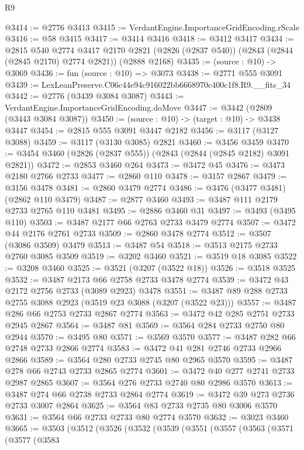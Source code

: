 \begin{lexlean}{R9}
\begin{coremodule}
@3414 := @2776 @3413
@3415 := VerdantEngine.ImportanceGridEncoding.rScale
@3416 := @58 @3415
@3417 := @3414 @3416
@3418 := @3412 @3417
@3434 := @2815
    @540
    @2774
    @3417
    @2170
    @2821
    (@2826 (@2837 @540))
    (@2843 (@2844 (@2845 @2170) @2774 @2821))
    (@2888 @2168)
@3435 := (source : @10) -> @3069
@3436 := fun (source : @10) => @3073
@3438 := @2771 @555 @3091
@3439 := LexLeanPreserve.C06c44e94c916022bb6668970c400c1f8.R9.__fits_34
@3442 := @2776 (@3439 @3084 @3087)
@3443 := VerdantEngine.ImportanceGridEncoding.doMove
@3447 := @3442 (@2809 (@3443 @3084 @3087))
@3450 := (source : @10) -> (target : @10) -> @3438 @3447
@3454 := @2815 @555 @3091 @3447 @2182
@3456 := @3117 (@3127 @3088)
@3459 := @3117 (@3130 @3085) @2821
@3460 := @3456 @3459
@3470 := @3454 @3460 (@2826 (@2837 @555)) (@2843 (@2844 (@2845 @2182) @3091 @2821))
@3472 := @2853 @3460 @264
@3473 := @3472 @45
@3476 := @3473 @2180 @2766 @2733
@3477 := @2860 @110
@3478 := @3157 @2867
@3479 := @3156 @3478
@3481 := @2860 @3479 @2774
@3486 := @3476 (@3477 @3481) (@2862 @110 @3479)
@3487 := @2877 @3460
@3493 := @3487 @111 @2179 @2733 @2765 @110 @3481
@3495 := @2886 @3460 @31
@3497 := @3493 (@3495 @110)
@3503 := @3487 @2177 @66 @2763 @2733 @3479 @2774
@3507 := @3472 @44 @2176 @2761 @2733
@3509 := @2860 @3478 @2774
@3512 := @3507 (@3086 @3509) @3479
@3513 := @3487 @54
@3518 := @3513 @2175 @2733 @2760 @3085 @3509
@3519 := @3202 @3460
@3521 := @3519 @18 @3085
@3522 := @3208 @3460
@3525 := @3521 (@3207 (@3522 @18))
@3526 := @3518 @3525
@3532 := @3487 @2173 @66 @2758 @2733 @3478 @2774
@3539 := @3472 @43 @2172 @2756 @2733 (@3089 @2923) @3478
@3551 := @3487 @89 @288 @2733 @2755 @3088 @2923 (@3519 @23 @3088 (@3207 (@3522 @23)))
@3557 := @3487 @286 @66 @2753 @2733 @2867 @2774
@3563 := @3472 @42 @285 @2751 @2733 @2945 @2867
@3564 := @3487 @81
@3569 := @3564 @284 @2733 @2750 @80 @2944
@3570 := @3495 @80
@3571 := @3569 @3570
@3577 := @3487 @282 @66 @2748 @2733 @2866 @2774
@3583 := @3472 @41 @281 @2746 @2733 @2966 @2866
@3589 := @3564 @280 @2733 @2745 @80 @2965 @3570
@3595 := @3487 @278 @66 @2743 @2733 @2865 @2774
@3601 := @3472 @40 @277 @2741 @2733 @2987 @2865
@3607 := @3564 @276 @2733 @2740 @80 @2986 @3570
@3613 := @3487 @274 @66 @2738 @2733 @2864 @2774
@3619 := @3472 @39 @273 @2736 @2733 @3007 @2864
@3625 := @3564 @83 @2733 @2735 @80 @3006 @3570
@3631 := @3564 @66 @2733 @2733 @80 @2774 @3570
@3632 := @3023 @3460
@3665 := @3503
    (@3512
      (@3526
        (@3532
          (@3539
            (@3551
              (@3557
                (@3563
                  (@3571
                    (@3577
                      (@3583

\end{coremodule}
\end{lexlean}
